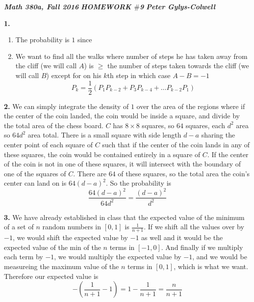 \documentclass[12pt]{article}
\newenvironment{ques}{\vspace{2 ex}}{\vspace{2 ex}}
\theoremstyle{definition}
\begin{document}
\noindent \textit{\textbf{Math 380a, Fall 2016}} \hspace{1.3cm}
\textit{\textbf{HOMEWORK $\#$9}} \hspace{1.3cm} \textit{\textbf{Peter
Gylys-Colwell}} 

\vspace{1cm}

\begin{ques}
	\textbf{1.} 
		\begin{enumerate}
			\item
				The probability is $1$ since

			\item
				We want to find all the walks where number of
				steps he has taken away from the cliff (we will
				call $A$) is $\geq$ the number of steps taken
				towards the cliff (we will call $B$) except for
				on his $k$th step in which case $A - B = -1$
				$$P_k = \frac{1}{2}(P_1P_{k-2} + P_3P_{k-4} +
				\dots P_{k-2}P_1)$$
		\end{enumerate}

\end{ques}

\begin{ques}
	\textbf{2.}  %
		We can simply integrate the density of $1$ over the area of the
		regions where if the center of the coin landed, the coin would
		be inside a square, and divide by the total area of the chess
		board. $C$ has $8 \times 8$ squares, so $64$ squares,
		each $d^2$ area so $64d^2$ area total. There is a small square
		with side length $d - a$ sharing the center point of each
		square of $C$ such that if the center of the coin lands in any of these
		squares, the coin would be contained entirely in a square of
		$C$. If the center of the coin is not in one of these squares,
		it will intersect with the boundary of one of the squares of
		$C$. There are $64$ of these squares, so the total area the
		coin's center can land on is $64(d-a)^2$. So the probability is 
		$$\frac{64(d-a)^2}{64d^2} = \frac{(d-a)^2}{d^2}$$

\end{ques}

\begin{ques}
	\textbf{3.}  %
		We have already established in class that the expected value of
		the minimum of a set of $n$ random numbers in $[0, 1]$ is
		$\frac{1}{n+1}$. If we shift all the values over by $-1$, we would
		shift the expected value by $-1$ as well and it would be the
		expected value of the min of the $n$ terms in $[-1, 0]$. And
		finally if we multiply each term by $-1$, we would multiply the
		expected value by $-1$, and we would be measureing the maximum
		value of the $n$ terms in $[0,1]$, which is what we want.
		Therefore our expected value is 
		$$-(\frac{1}{n+1} - 1) = 1 - \frac{1}{n+1} = \frac{n}{n+1}$$

\end{ques}
\end{document}
